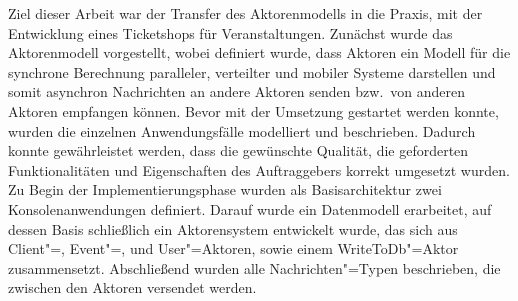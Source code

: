 Ziel dieser Arbeit war der Transfer des Aktorenmodells in die Praxis, mit der Entwicklung eines Ticketshops für Veranstaltungen.
Zunächst wurde das Aktorenmodell vorgestellt, wobei definiert wurde, dass Aktoren ein Modell für die synchrone Berechnung paralleler, verteilter und mobiler Systeme darstellen und somit asynchron Nachrichten an andere Aktoren senden bzw.\ von anderen Aktoren empfangen können.
Bevor mit der Umsetzung gestartet werden konnte, wurden die einzelnen Anwendungsfälle modelliert und beschrieben.
Dadurch konnte gewährleistet werden, dass die gewünschte Qualität, die geforderten Funktionalitäten und Eigenschaften des Auftraggebers korrekt umgesetzt wurden.
Zu Begin der Implementierungsphase wurden als Basisarchitektur zwei Konsolenanwendungen definiert.
Darauf wurde ein Datenmodell erarbeitet, auf dessen Basis schließlich ein Aktorensystem entwickelt wurde, das sich aus Client"=, Event"=, und User"=Aktoren, sowie einem WriteToDb"=Aktor zusammensetzt.
Abschließend wurden alle Nachrichten"=Typen beschrieben, die zwischen den Aktoren versendet werden.
